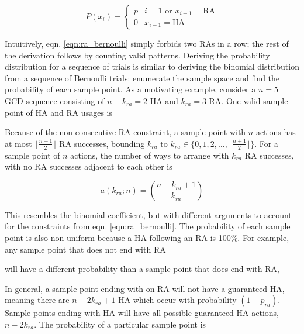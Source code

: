 \begin{equation}
  P(x_i) = 
    \begin{cases}
       p & i = 1 \text{ or } x_{i-1} = \textrm{RA} \\
        0 & x_{i-1} = \textrm{HA}
    \end{cases}
    \label{eqn:ra_bernoulli}
\end{equation}

Intuitively, eqn. \ref{eqn:ra_bernoulli} simply forbids two RAs in a row; the rest of the derivation follows by counting valid patterns. Deriving the probability distribution for a sequence of trials is similar to deriving the binomial distribution from a sequence of Bernoulli trials: enumerate the sample space and find the probability of each sample point. As a motivating example, consider a $n=5$ GCD sequence consisting of $n-k_{ra} = 2$ HA and $k_{ra} = 3$ RA. One valid sample point of HA and RA usages is


Because of the non-consecutive RA constraint, a sample point with $n$ actions has at most $\lfloor \frac{n +1}{2} \rfloor$ RA successes, bounding $k_{ra}$ to $k_{ra} \in \{0, 1, 2, \dots, \lfloor \frac{n +1}{2} \rfloor \}$. For a sample point of $n$ actions, the number of ways to arrange with $k_{ra}$ RA successes, with no RA successes adjacent to each other is

\begin{equation}
    a(k_{ra}; n) = \binom{n-k_{ra}+1}{k_{ra}}
    \label{eqn:ra_sequences_a}
\end{equation}

This resembles the binomial coefficient, but with different arguments to account for the constraints from eqn. \ref{eqn:ra_bernoulli}. The probability of each sample point is also non-uniform because a HA following an RA is 100\%. For example, any sample point that does not end with RA


will have a different probability than a sample point that does end with RA,


In general, a sample point ending with on RA will not have a guaranteed HA, meaning there are $n-2k_{ra}+1$ HA which occur with probability $(1-p_{ra})$. Sample points ending with HA will have all possible guaranteed HA actions, $n-2k_{ra}$. The probability of a particular sample point is

